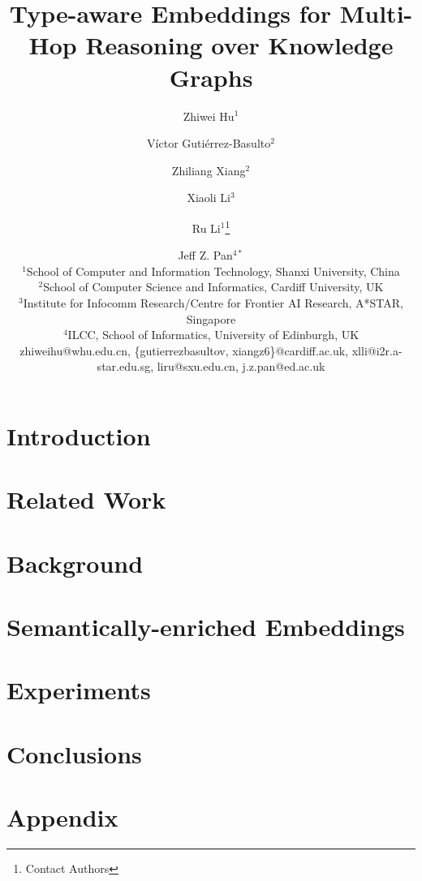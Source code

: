 \documentclass{article}
\title{%
Type-aware Embeddings for Multi-Hop Reasoning over Knowledge Graphs}
\author{
 Zhiwei Hu$^1$\and %
 Víctor Gutiérrez-Basulto$^{2}$\and
 Zhiliang Xiang$^{2}$\and
 Xiaoli Li$^3$ \and
 Ru Li$^1$\footnote{Contact Authors}\and
 Jeff Z. Pan$^{4*}$ 
 \\
 \affiliations
 $^1$School of Computer and Information Technology, Shanxi University, China\\
 $^2$School of Computer Science and Informatics, Cardiff University, UK\\
 $^3$Institute for Infocomm Research/Centre for Frontier AI Research, A*STAR, Singapore\\
 $^4$ILCC, School of Informatics, University of Edinburgh, UK\\
 \emails
 zhiweihu@whu.edu.cn,
 \{gutierrezbasultov, xiangz6\}@cardiff.ac.uk,
 xlli@i2r.a-star.edu.sg,
 liru@sxu.edu.cn, j.z.pan@ed.ac.uk
 }
\begin{document}
\maketitle
  


\section{Introduction}


\section{Related Work}


\section{Background}


\section{Semantically-enriched Embeddings}%


\section{Experiments}


% 

\section{Conclusions}






\clearpage
 \section*{Appendix}

\end{document}

